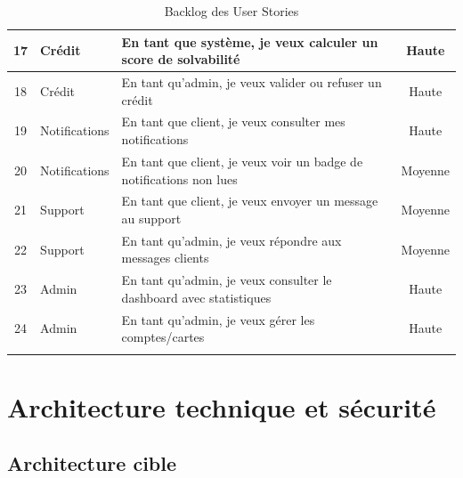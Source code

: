 \documentclass[12pt,a4paper]{report}
\begin{document}
\begin{longtable}{|c|p{2.5cm}|p{8cm}|c|}
\hline
17 & Crédit & En tant que système, je veux calculer un score de solvabilité & Haute \\
\hline
18 & Crédit & En tant qu'admin, je veux valider ou refuser un crédit & Haute \\
\hline
19 & Notifications & En tant que client, je veux consulter mes notifications & Haute \\
\hline
20 & Notifications & En tant que client, je veux voir un badge de notifications non lues & Moyenne \\
\hline
21 & Support & En tant que client, je veux envoyer un message au support & Moyenne \\
\hline
22 & Support & En tant qu'admin, je veux répondre aux messages clients & Moyenne \\
\hline
23 & Admin & En tant qu'admin, je veux consulter le dashboard avec statistiques & Haute \\
\hline
24 & Admin & En tant qu'admin, je veux gérer les comptes/cartes & Haute \\
\hline

\caption{Backlog des User Stories}
\end{longtable}

\chapter{Architecture technique et sécurité}

\section{Architecture cible}
\end{document}
